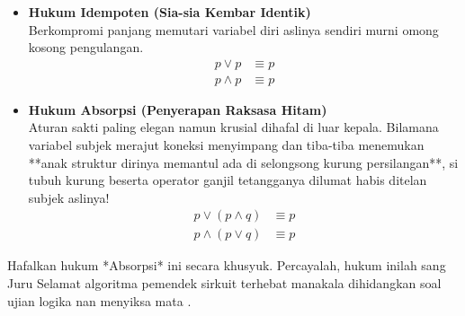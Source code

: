 \begin{itemize}
    \item \textbf{Hukum Idempoten (Sia-sia Kembar Identik)} \\
    Berkompromi panjang memutari variabel diri aslinya sendiri murni omong kosong pengulangan.
    \begin{align*}
        p \vee p &\equiv p \\
        p \wedge p &\equiv p
    \end{align*}

    \item \textbf{Hukum Absorpsi (Penyerapan Raksasa Hitam)} \\
    Aturan sakti paling elegan namun krusial dihafal di luar kepala. Bilamana variabel subjek merajut koneksi menyimpang dan tiba-tiba menemukan **anak struktur dirinya memantul ada di selongsong kurung persilangan**, si tubuh kurung beserta operator ganjil tetangganya dilumat habis ditelan subjek aslinya!
    \begin{align*}
        p \vee (p \wedge q) &\equiv p \\
        p \wedge (p \vee q) &\equiv p
    \end{align*}
\end{itemize}
Hafalkan hukum *Absorpsi* ini secara khusyuk. Percayalah, hukum inilah sang Juru Selamat algoritma pemendek sirkuit terhebat manakala dihidangkan soal ujian logika nan menyiksa mata \cite{wiki_proplogic}.
